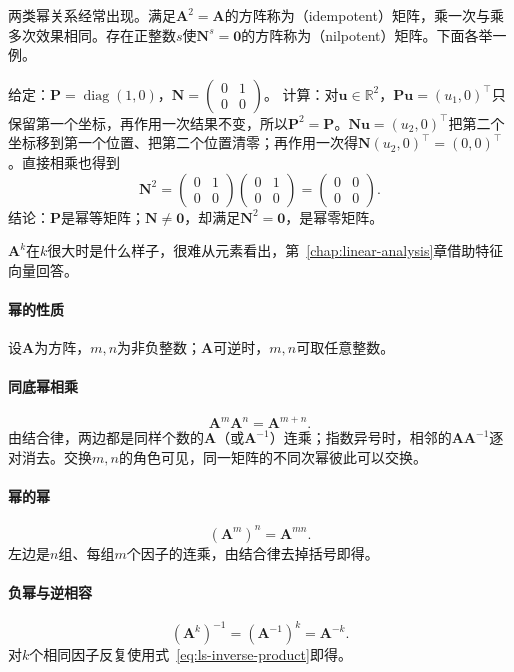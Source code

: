 两类幂关系经常出现。满足$\bm A^2=\bm A$的方阵称为（idempotent）矩阵，乘一次与乘多次效果相同。存在正整数$s$使$\bm N^s=\bm0$的方阵称为（nilpotent）矩阵。下面各举一例。
\begin{example}[幂等矩阵与幂零矩阵]
\label{ex:ls-idempotent-nilpotent}
给定：$\bm P=\operatorname{diag}(1,0)$，$\bm N=\left(\begin{smallmatrix}0&1\\0&0\end{smallmatrix}\right)$。
计算：对$\bm u\in\mathbb R^2$，$\bm P\bm u=(u_1,0)^\top$只保留第一个坐标，再作用一次结果不变，所以$\bm P^2=\bm P$。$\bm N\bm u=(u_2,0)^\top$把第二个坐标移到第一个位置、把第二个位置清零；再作用一次得$\bm N(u_2,0)^\top=(0,0)^\top$。直接相乘也得到
\[
 \bm N^2=\begin{pmatrix}0&1\\0&0\end{pmatrix}\begin{pmatrix}0&1\\0&0\end{pmatrix}=\begin{pmatrix}0&0\\0&0\end{pmatrix}.
\]
结论：$\bm P$是幂等矩阵；$\bm N\neq\bm0$，却满足$\bm N^2=\bm0$，是幂零矩阵。
\end{example}
$\bm A^k$在$k$很大时是什么样子，很难从元素看出，第~\ref{chap:linear-analysis}章借助特征向量回答。

\paragraph{幂的性质}

设$\bm A$为方阵，$m,n$为非负整数；$\bm A$可逆时，$m,n$可取任意整数。

\paragraph{同底幂相乘}
\[
 \bm A^m\bm A^n=\bm A^{m+n}.
\]
由结合律，两边都是同样个数的$\bm A$（或$\bm A^{-1}$）连乘；指数异号时，相邻的$\bm A\bm A^{-1}$逐对消去。交换$m,n$的角色可见，同一矩阵的不同次幂彼此可以交换。

\paragraph{幂的幂}
\[
 (\bm A^m)^n=\bm A^{mn}.
\]
左边是$n$组、每组$m$个因子的连乘，由结合律去掉括号即得。

\paragraph{负幂与逆相容}
\[
 (\bm A^k)^{-1}=(\bm A^{-1})^k=\bm A^{-k}.
\]
对$k$个相同因子反复使用式~\eqref{eq:ls-inverse-product}即得。
